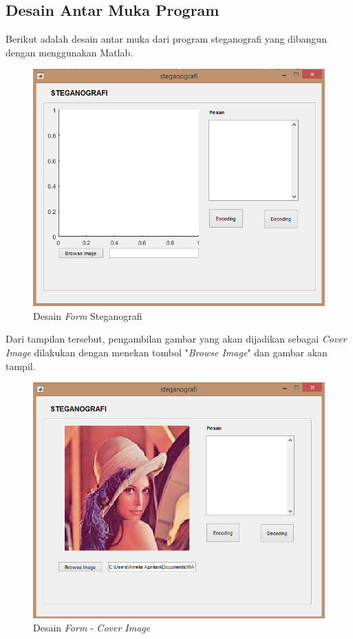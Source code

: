 	\subsection{Desain Antar Muka Program}
	
	Berikut adalah desain antar muka dari program steganografi yang dibangun dengan menggunakan Matlab.
	
	\begin{figure}[H]
		\centering
		\includegraphics[width=1\textwidth]{gambar/mockup/1}
		\caption{Desain \emph{Form} Steganografi}
		\label{desain_form}
	\end{figure}

	Dari tampilan tersebut, pengambilan gambar yang akan dijadikan sebagai \emph{Cover Image} dilakukan dengan menekan tombol "\emph{Browse Image}" dan gambar akan tampil. 
	
	\begin{figure}[H]
		\centering
		\includegraphics[width=1\textwidth]{gambar/mockup/2}
		\caption{Desain \emph{Form} - \emph{Cover Image}}
		\label{desain_image}
	\end{figure}


